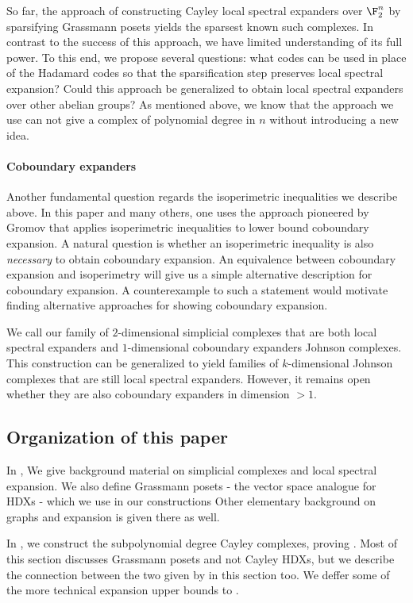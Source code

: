 So far, the approach of constructing Cayley local spectral expanders over $\F_2^n$ by sparsifying Grassmann posets yields the sparsest known such complexes. In contrast to the success of this approach, we have limited understanding of its full power. To this end, we propose several questions: what codes can be used in place of the Hadamard codes so that the sparsification step preserves local spectral expansion?  Could this approach be generalized to obtain local spectral expanders over other abelian groups? As mentioned above, we know that the approach we use can not give a complex of polynomial degree in \(n\) without introducing a new idea.

\paragraph{Coboundary expanders}Another fundamental question regards the isoperimetric inequalities we describe above. In this paper and many others, one uses the approach pioneered by Gromov \cite{Gromov2010} that applies isoperimetric inequalities to lower bound coboundary expansion. A natural question is whether an isoperimetric inequality is also \emph{necessary} to obtain coboundary expansion. An equivalence between coboundary expansion and isoperimetry will give us a simple alternative description for coboundary expansion. A counterexample to such a statement would motivate finding alternative approaches for showing coboundary expansion.

We call our family of $2$-dimensional simplicial complexes that are both local spectral expanders and $1$-dimensional coboundary expanders Johnson complexes. This construction can be generalized to yield families of $k$-dimensional Johnson complexes that are still local spectral expanders. However, it remains open whether they are also coboundary expanders in dimension $>1$.

\subsection{Organization of this paper}
In , We give background material on simplicial complexes and local spectral expansion. We also define Grassmann posets - the vector space analogue for HDXs - which we use in our constructions Other elementary background on graphs and expansion is given there as well.

In , we construct the subpolynomial degree Cayley complexes, proving . Most of this section discusses Grassmann posets and not Cayley HDXs, but we describe the connection between the two given by \cite{Golowich2023} in this section too. We deffer some of the more technical expansion upper bounds to .

